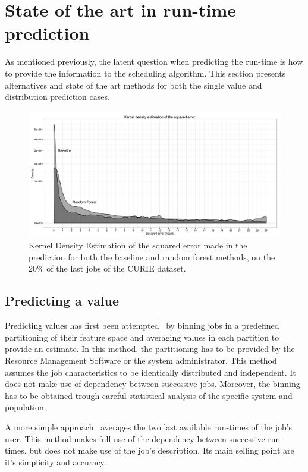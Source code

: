 \documentclass{article}
\begin{document}
\section{State of the art in run-time prediction}

As mentioned previously, the latent question when predicting the run-time is how to provide the information to the scheduling algorithm. This section presents alternatives and state of the art methods for both the single value and distribution prediction cases.

\begin{figure}[b]
  \centering
  \includegraphics[width=\textwidth]{error.png}
  \caption{Kernel Density Estimation of the squared error made in the prediction for both the baseline and random forest methods, on the 20\% of the last jobs of the CURIE dataset.}
  \label{fig:ratio}
\end{figure}

\subsection{Predicting a value}
\label{sub:predicting_a_value}

Predicting values has first been attempted~\cite{gibbons} by binning jobs in a predefined partitioning of their feature space and averaging values in each partition to provide an estimate. In this method, the partitioning has to be provided by the Resource Management Software or the system administrator. This method assumes the job characteristics to be identically distributed and independent. It does not make use of dependency between successive jobs. Moreover, the binning has to be obtained trough careful statistical analysis of the specific system and population.

A more simple approach~\cite{tsafir} averages the two last available run-times of the job's user.
This method makes full use of the dependency between successive run-times, but does not make use of the job's description. Its main selling point are it's simplicity and accuracy.
\end{document}
